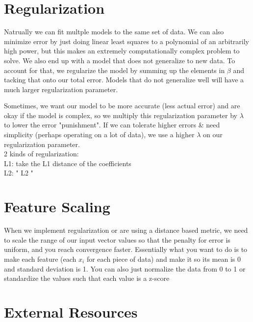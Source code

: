 \documentclass{article}
\begin{document}
\section{Regularization}
Natrually we can fit multple models to the same set of data. We can also minimize error by just doing linear least squares to a polynomial of an arbitrarily high power, but this makes an extremely computationally complex problem to solve. We also end up with a model that does not generalize to new data. To account for that, we regularize the model by summing up the elements in $\beta$ and tacking that onto our total error. Models that do not generalize well will have a much larger regularization parameter. 

Sometimes, we want our model to be more accurate (less actual error) and are okay if the model is complex, so we multiply this regularization parameter by $\lambda$ to lower the error "punishment". If we can tolerate higher errors & need simplicity (perhaps operating on a lot of data), we use a higher $\lambda$ on our regularization parameter. \\

2 kinds of regularization:\\
L1: take the L1 distance of the coefficients\\
L2:    "     L2             "
\section{Feature Scaling}
When we implement regularization or are using a distance based metric, we need to scale the range of our input vector values so that the penalty for error is uniform, and you reach convergence faster. Essentially what you want to do is to make each feature (each $x_i$ for each piece of data) and make it so its mean is 0 and standard deviation is 1. You can also just normalize the data from 0 to 1 or standardize the values such that each value is a z-score
\section{External Resources}
\end{document}
